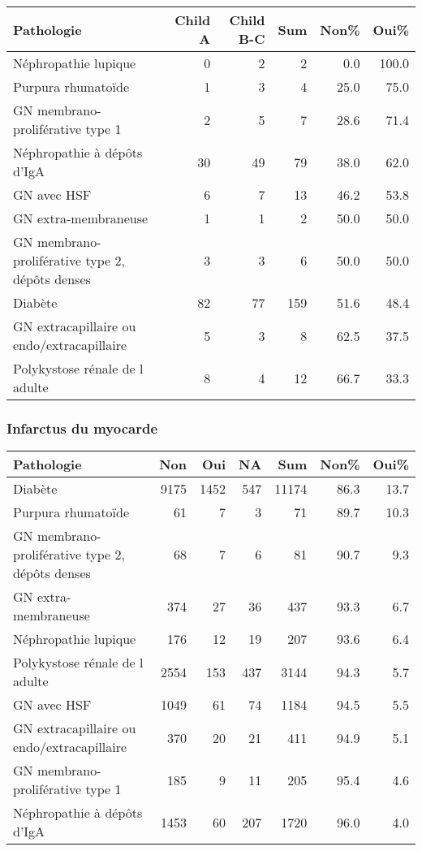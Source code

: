 \documentclass[11pt,a4paper]{article}\usepackage[]{graphicx}\usepackage[]{color}
\begin{document}
\begin{table}[H]
\centering
\begin{tabular}{lrrrrr}
  \hline
Pathologie & Child A & Child B-C & Sum & Non\% & Oui\% \\ 
  \hline
Néphropathie lupique &  0 &  2 &  2 & 0.0 & 100.0 \\ 
  Purpura rhumatoïde &  1 &  3 &  4 & 25.0 & 75.0 \\ 
  GN membrano-proliférative type 1 &  2 &  5 &  7 & 28.6 & 71.4 \\ 
  Néphropathie à dépôts d'IgA & 30 & 49 & 79 & 38.0 & 62.0 \\ 
  GN avec HSF &  6 &  7 & 13 & 46.2 & 53.8 \\ 
  GN extra-membraneuse &  1 &  1 &  2 & 50.0 & 50.0 \\ 
  GN membrano-proliférative type 2, dépôts denses &  3 &  3 &  6 & 50.0 & 50.0 \\ 
  Diabète & 82 & 77 & 159 & 51.6 & 48.4 \\ 
  GN extracapillaire ou endo/extracapillaire &  5 &  3 &  8 & 62.5 & 37.5 \\ 
  Polykystose rénale de l adulte &  8 &  4 & 12 & 66.7 & 33.3 \\ 
   \hline
\end{tabular}
\end{table}


\subsubsection*{Infarctus du myocarde}

\begin{table}[H]
\centering
\begin{tabular}{lrrrrrr}
  \hline
Pathologie & Non & Oui & NA & Sum & Non\% & Oui\% \\ 
  \hline
Diabète & 9175 & 1452 & 547 & 11174 & 86.3 & 13.7 \\ 
  Purpura rhumatoïde & 61 &  7 &  3 & 71 & 89.7 & 10.3 \\ 
  GN membrano-proliférative type 2, dépôts denses & 68 &  7 &  6 & 81 & 90.7 & 9.3 \\ 
  GN extra-membraneuse & 374 & 27 & 36 & 437 & 93.3 & 6.7 \\ 
  Néphropathie lupique & 176 & 12 & 19 & 207 & 93.6 & 6.4 \\ 
  Polykystose rénale de l adulte & 2554 & 153 & 437 & 3144 & 94.3 & 5.7 \\ 
  GN avec HSF & 1049 & 61 & 74 & 1184 & 94.5 & 5.5 \\ 
  GN extracapillaire ou endo/extracapillaire & 370 & 20 & 21 & 411 & 94.9 & 5.1 \\ 
  GN membrano-proliférative type 1 & 185 &  9 & 11 & 205 & 95.4 & 4.6 \\ 
  Néphropathie à dépôts d'IgA & 1453 & 60 & 207 & 1720 & 96.0 & 4.0 \\ 
   \hline
\end{tabular}
\end{table}
\end{document}
